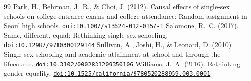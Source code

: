 \documentclass[11pt]{article}
\providecommand{\doi}[1]{\href{https://doi.org/#1}{\nolinkurl{doi:#1}}}
\begin{document}
\begin{thebibliography}{99}
 Park, H., Behrman, J.~R., \& Choi, J. (2012). Causal effects of single-sex schools on college entrance exams and college attendance: Random assignment in Seoul high schools. \doi{10.1007/s13524-012-0157-1}
 Salomone, R.~C. (2017). Same, different, equal: Rethinking single-sex schooling. \doi{10.12987/9780300129144}
 Sullivan, A., Joshi, H., \& Leonard, D. (2010). Single-sex schooling and academic attainment at school and through the lifecourse. \doi{10.3102/0002831209350106}
 Williams, J.~A. (2016). Rethinking gender equality. \doi{10.1525/california/9780520288959.003.0001}
\end{thebibliography}
\end{document}
